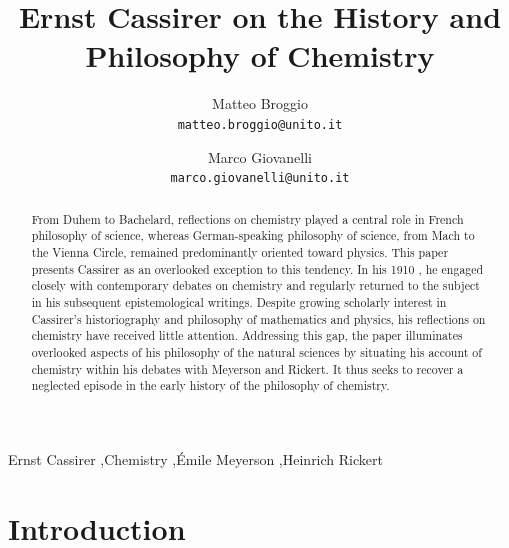\documentclass[submitted,12pt]{article}
\title{Ernst Cassirer on the History and Philosophy of Chemistry}
\author{}
\author{\small
Matteo Broggio\\
  \texttt{matteo.broggio@unito.it}
  \and
\small  Marco Giovanelli\\
  \texttt{marco.giovanelli@unito.it}
}
\begin{document}
\maketitle


\begin{abstract}
From Duhem to Bachelard, reflections on chemistry played a central role in French philosophy of science, whereas German-speaking philosophy of science, from Mach to the Vienna Circle, remained predominantly oriented toward physics. This paper presents Cassirer as an overlooked exception to this tendency. In his 1910 \SFt, he engaged closely with contemporary debates on chemistry and regularly returned to the subject in his subsequent epistemological writings. Despite growing scholarly interest in Cassirer’s historiography and philosophy of mathematics and physics, his reflections on chemistry have received little attention. Addressing this gap, the paper illuminates overlooked aspects of his philosophy of the natural sciences by situating his account of chemistry within his debates with Meyerson and Rickert. It thus seeks to recover a neglected episode in the early history of the philosophy of chemistry.
\end{abstract}

\begin{keywords}
Ernst Cassirer \sep Chemistry \sep Émile Meyerson \sep Heinrich Rickert
\end{keywords}

\section*{Introduction}
\end{document}
